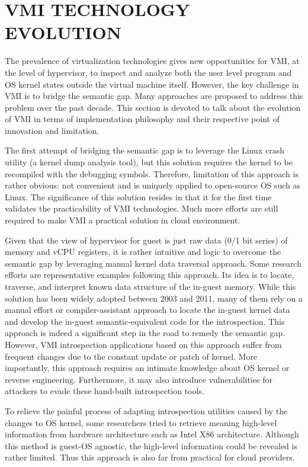 \section{VMI TECHNOLOGY EVOLUTION}

The prevalence of virtualization technologies gives new opportunities for VMI, at the level of hypervisor, to inspect and analyze both the user 
level program and OS kernel states outside the virtual machine itself. However, the key challenge in VMI is to bridge the semantic gap. Many 
approaches are proposed to address this problem over the past decade. This section is devoted to talk about the evolution of VMI in terms of 
implementation philosophy and their respective point of innovation and limitation.

The first attempt \cite{Reference1} of bridging the semantic gap is to leverage the Linux crash utility (a kernel dump analysis tool), but this 
solution requires the kernel to be recompiled with the debugging symbols. Therefore, limitation of this approach is rather obvious: not convenient
and is uniquely applied to open-source OS such as Linux. The significance of this solution resides in that it for the first time validates the 
practicability of VMI technologies. Much more efforts are still required to make VMI a practical solution in cloud environment.

Given that the view of hypervisor for guest is just raw data (0/1 bit series) of memory and vCPU registers, it is rather intuitive and logic to 
overcome the semantic gap by leveraging manual kernel data traversal approach. Some research efforts \cite{Reference2} are representative examples
following this approach. Its idea is to locate, traverse, and interpret known data structure of the in-guest memory. While this solution has 
been widely adopted between 2003 and 2011, many of them rely on a manual effort or compiler-assistant approach to locate the in-guest kernel 
data and develop the in-guest semantic-equivalent code for the introspection. This approach is indeed a significant step in the road to remedy 
the semantic gap. However, VMI introspection applications based on this approach suffer from frequent changes due to the constant update or 
patch of kernel. More importantly, this approach requires an intimate knowledge about OS kernel or reverse engineering. Furthermore, it may also
introduce vulnerabilities for attackers to evade these hand-built introspection tools.

To relieve the painful process of adapting introspection utilities caused by the changes to OS kernel, some researchers \cite{Reference4, Reference7}
tried to retrieve meaning high-level information from hardware architecture such as Intel X86 architecture. Although this method is guest-OS 
agnostic, the high-level information could be revealed is rather limited. Thus this approach is also far from practical for cloud providers.


